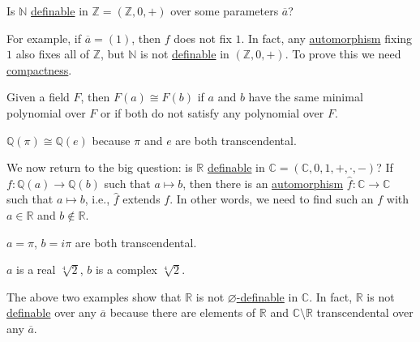 \begin{problem*}
	Is \(\mathbb{N} \) \hyperref[def:definable]{definable} in \(\mathbb{Z} =(\mathbb{Z} , 0, +)\) over some parameters \(\overline{a} \)?
\end{problem*}
\begin{answer}
	For example, if \(\overline{a} =(1)\), then \(f\) does not fix \(1\). In fact, any \hyperref[def:automorphism]{automorphism} fixing \(1\) also fixes all of \(\mathbb{Z} \), but \(\mathbb{N} \) is not \hyperref[def:definable]{definable} in \((\mathbb{Z} , 0, +)\). To prove this we need \hyperref[def:compactness]{compactness}.
\end{answer}

\begin{prev}
	Given a field \(F\), then \(F(a) \cong F(b)\) if \(a\) and \(b\) have the same minimal polynomial over \(F\) or if both do not satisfy any polynomial over \(F\).
\end{prev}

\begin{eg}
	\(\mathbb{Q} (\pi ) \cong \mathbb{Q} (e)\) because \(\pi \) and \(e\) are both transcendental.
\end{eg}

We now return to the big question: is \(\mathbb{R} \) \hyperref[def:definable]{definable} in \(\mathbb{C} = (\mathbb{C} , 0, 1, +, \cdot, -)\)? If \(f\colon \mathbb{Q} (a) \to  \mathbb{Q} (b)\) such that \(a\mapsto b\), then there is an \hyperref[def:automorphism]{automorphism} \(\hat{f} \colon \mathbb{C} \to  \mathbb{C} \) such that \(a\mapsto b\), i.e., \(\hat{f} \) extends \(f\). In other words, we need to find such an \(f\) with \(a\in \mathbb{R} \) and \(b\notin \mathbb{R} \).

\begin{eg}
	\(a = \pi \), \(b = i \pi \) are both transcendental.
\end{eg}

\begin{eg}
	\(a\) is a real \(\sqrt[4]{2}\), \(b\) is a complex \(\sqrt[4]{2} \).
\end{eg}

The above two examples show that \(\mathbb{R} \) is not \hyperref[def:definable]{\(\varnothing \)-definable} in \(\mathbb{C} \). In fact, \(\mathbb{R} \) is not \hyperref[def:definable]{definable} over any \(\overline{a} \) because there are elements of \(\mathbb{R} \) and \(\mathbb{C} \setminus \mathbb{R} \) transcendental over any \(\overline{a} \).


